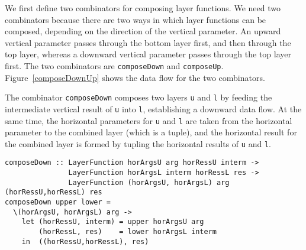 We first define two combinators for composing layer functions. We need two combinators because there are two ways in which layer functions can be composed, depending on the direction of the vertical parameter. An upward vertical parameter passes through the bottom layer first, and then through the top layer, whereas a downward vertical parameter passes through the top layer first. The two combinators are \texttt{composeDown} and \texttt{composeUp}. Figure~\ref{composeDownUp} shows the data flow for the two combinators. 

The combinator \texttt{composeDown} composes two layers \texttt{u} and \texttt{l} by feeding the intermediate vertical result of \texttt{u} into \texttt{l}, establishing a downward data flow. At the same time, the horizontal parameters for \texttt{u} and \texttt{l} are taken from the horizontal parameter to the combined layer (which is a tuple), and the horizontal result for the combined layer is formed by tupling the horizontal results of \texttt{u} and \texttt{l}.

\begin{small}
\begin{verbatim}
composeDown :: LayerFunction horArgsU arg horRessU interm ->
               LayerFunction horArgsL interm horRessL res ->
               LayerFunction (horArgsU, horArgsL) arg (horRessU,horRessL) res
composeDown upper lower = 
  \(horArgsU, horArgsL) arg ->                                           
    let (horRessU, interm) = upper horArgsU arg
        (horRessL, res)    = lower horArgsL interm            
    in  ((horRessU,horRessL), res)
\end{verbatim}
\end{small}

